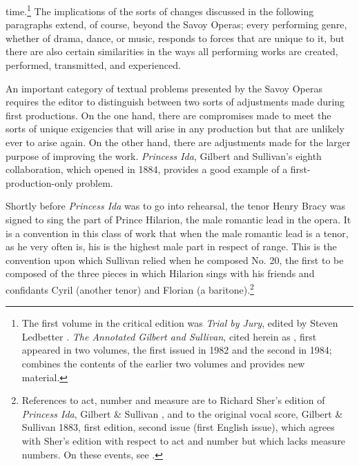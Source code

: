 \begin{paper}
time.\footnote{The first volume in the critical edition was \emph{Trial
  by Jury}, edited by Steven Ledbetter \citep{gilbert_trial_1993}.
  \emph{The Annotated Gilbert and Sullivan}, cited herein as \citealt{bradley_ian_complete_1996}, first appeared in two volumes, the first issued in 1982 and the
  second in 1984; \citealt{bradley_ian_complete_1996} combines the contents of the earlier two
  volumes and provides new material.} The implications of the sorts of
changes discussed in the following paragraphs extend, of course, beyond
the Savoy Operas; every performing genre, whether of drama, dance, or
music, responds to forces that are unique to it, but there are also
certain similarities in the ways all performing works are created,
performed, transmitted, and experienced.

An important category of textual problems presented by the Savoy Operas
requires the editor to distinguish between two sorts of adjustments made
during first productions. On the one hand, there are compromises made to
meet the sorts of unique exigencies that will arise in any production
but that are unlikely ever to arise again. On the other hand, there are
adjustments made for the larger purpose of improving the work.
\emph{Princess Ida}, Gilbert and Sullivan's eighth collaboration, which
opened in 1884, provides a good example of a first-production-only
problem.

Shortly before \emph{Princess Ida} was to go into rehearsal, the tenor
Henry Bracy was signed to sing the part of Prince Hilarion, the male
romantic lead in the opera. It is a convention in this class of work
that when the male romantic lead is a tenor, as he very often is, his is
the highest male part in respect of range. This is the convention upon
which Sullivan relied when he composed No. 20, the first to be composed
of the three pieces in which Hilarion sings with his friends and
confidants Cyril (another tenor) and Florian (a baritone).\footnote{References
  to act, number and measure are to Richard Sher's edition of
  \emph{Princess Ida}, Gilbert \& Sullivan \citeyearpar{gilbert_princess_2021}, and to the original
  vocal score, Gilbert \& Sullivan 1883, first edition, second issue
  (first English issue), which agrees with Sher's edition with respect
  to act and number but which lacks measure numbers. On these events,
  see \citealt{gilbert_princess_2021}.}


\end{paper}
